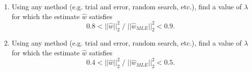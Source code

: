 \begin{enumerate}
\begin{enumerate}
\begin{enumerate}
\end{enumerate}

\item Using any method (e.g. trial and error, random search, etc.), find a value of $\lambda$ for which the estimate $\hat{w}$ satisfies $$0.8 < ||\hat{w}||_2^2 \; / \; ||\hat{w}_{MLE}||_2^2 < 0.9.$$ 

\item Using any method (e.g. trial and error, random search, etc.), find a value of $\lambda$ for which the estimate $\hat{w}$ satisfies $$0.4 < ||\hat{w}||_2^2 \; / \; ||\hat{w}_{MLE}||_2^2 < 0.5.$$

\end{enumerate}
\end{enumerate}
